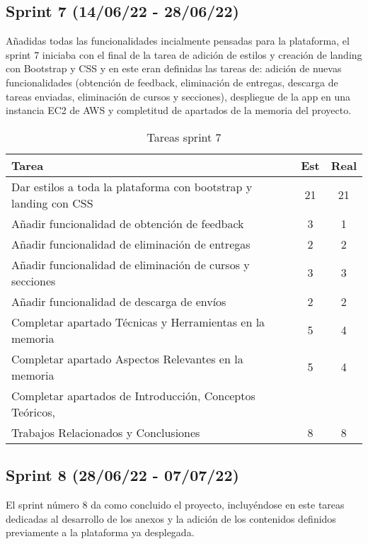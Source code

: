 \subsection{Sprint 7 (14/06/22 - 28/06/22)}
Añadidas todas las funcionalidades incialmente pensadas para la plataforma, el sprint 7 iniciaba con el final de la tarea de adición de estilos y creación de landing con Bootstrap\cite{tool:Bootstrap} y CSS\cite{tool:CSS} y en este eran definidas las tareas de: adición de nuevas funcionalidades (obtención de feedback, eliminación de entregas, descarga de tareas enviadas, eliminación de cursos y secciones), despliegue de la app en una instancia EC2 de AWS\cite{tool:AWS} y completitud de apartados de la memoria del proyecto.

\begin{table}[H]
\begin{center}
\begin{tabular}{| l | c | c |}
\textbf{Tarea}                   & \textbf{Est} & \textbf{Real} \\ \hline
Dar estilos a toda la plataforma con bootstrap y landing con CSS
 & 21 & 21 \\
Añadir funcionalidad de obtención de feedback & 3 & 1 \\
Añadir funcionalidad de eliminación de entregas & 2 & 2 \\
Añadir funcionalidad de eliminación de cursos y secciones & 3 & 3 \\
Añadir funcionalidad de descarga de envíos & 2 & 2 \\
Completar apartado Técnicas y Herramientas en la memoria & 5 & 4 \\ 
Completar apartado Aspectos Relevantes en la memoria & 5 & 4 \\ 
Completar apartados de Introducción, Conceptos Teóricos, & &\\
Trabajos Relacionados y Conclusiones & 8 & 8 \\ \hline
\end{tabular}
\caption{Tareas sprint 7}
\label{tab:sprint}
\end{center}
\end{table}


\subsection{Sprint 8 (28/06/22 - 07/07/22)}
El sprint número 8 da como concluido el proyecto, incluyéndose en este tareas dedicadas al desarrollo de los anexos y la adición de los contenidos definidos previamente a la plataforma ya desplegada.


